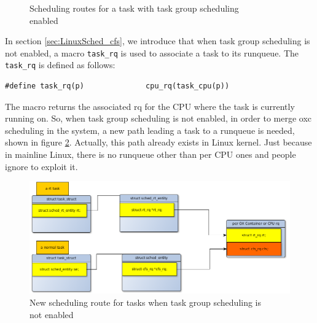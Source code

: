 \begin{figure}[htbp]
\begin{center}
\end{center}
	\caption{Scheduling routes for a task with task group scheduling
			\\\indent\hspace{6cm} enabled }
	\label{fig:scheduling_route_oxc}
\end{figure}

In section \ref{sec:LinuxSched_cfs}, we introduce that when task group
scheduling is not enabled, a macro \texttt{task\_rq} is used to associate
a task to its runqueue. The \texttt{task\_rq} is defined as follows:
\begin{lstlisting}
#define task_rq(p)              cpu_rq(task_cpu(p))
\end{lstlisting}
The macro returns the associated rq for the CPU where the task is currently 
running on. So, when task group scheduling is not enabled, in order to merge
oxc scheduling in the system, a new path leading a task to a runqueue is 
needed, shown in figure \ref{fig:oxc_task_no_tg}. Actually, this path already 
exists in Linux kernel. Just because in mainline Linux, there is no runqueue 
other than per CPU ones and people ignore to exploit it.  
\begin{figure}[htbp]
        \centering
        \includegraphics[width=\textwidth]{images/oxc_task_no_tg}
        \caption{New scheduling route for tasks when task group scheduling is \\
			\indent\hspace{6cm} not enabled}
        \label{fig:oxc_task_no_tg}
\end{figure}

